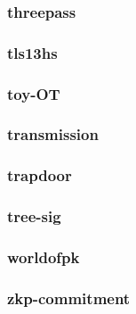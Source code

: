 \begin{frame} \frametitle{threepass}
\begin{figure}
\begin{center}

\end{center}
\end{figure}
\end{frame}
\begin{frame} \frametitle{tls13hs}
\begin{figure}
\begin{center}

\end{center}
\end{figure}
\end{frame}
\begin{frame} \frametitle{toy-OT}
\begin{figure}
\begin{center}

\end{center}
\end{figure}
\end{frame}
\begin{frame} \frametitle{transmission}
\begin{figure}
\begin{center}

\end{center}
\end{figure}
\end{frame}
\begin{frame} \frametitle{trapdoor}
\begin{figure}
\begin{center}

\end{center}
\end{figure}
\end{frame}
\begin{frame} \frametitle{tree-sig}
\begin{figure}
\begin{center}

\end{center}
\end{figure}
\end{frame}
\begin{frame} \frametitle{worldofpk}
\begin{figure}
\begin{center}

\end{center}
\end{figure}
\end{frame}
\begin{frame} \frametitle{zkp-commitment}
\begin{figure}
\begin{center}

\end{center}
\end{figure}
\end{frame}
